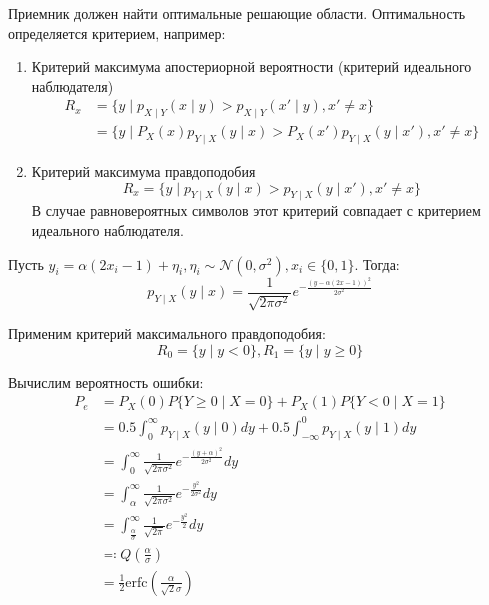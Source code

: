 Приемник должен найти оптимальные решающие области.
Оптимальность определяется критерием, например:
\begin{enumerate}
    \item Критерий максимума апостериорной вероятности (критерий идеального наблюдателя)
          \begin{align*}
              R_x
               & = \{y \mid p_{X \mid Y}(x \mid y) > p_{X \mid Y} (x' \mid y), x ' \neq x\}               \\
               & = \{y \mid P_X(x) p_{Y \mid X}(y \mid x) > P_X(x') p_{Y \mid X} (y \mid x'), x' \neq x\}
          \end{align*}
    \item Критерий максимума правдоподобия
          \[R_x = \{y \mid p_{Y \mid X}(y \mid x) > p_{Y \mid X}(y \mid x'), x' \neq x\}\]
          В случае равновероятных символов этот критерий совпадает с критерием идеального наблюдателя.
\end{enumerate}

\begin{example}
    Пусть \(y_i = \alpha(2x_i - 1) + \eta_i, \eta_i \sim \mathcal{N}(0, \sigma^2), x_i \in \{0, 1\} \). Тогда:
    \[p_{Y \mid X}(y \mid x)
        = \frac{1}{\sqrt{2 \pi \sigma^2}} e^{- \frac{(y - \alpha(2x - 1))^2}{2 \sigma^2}}\]

    Применим критерий максимального правдоподобия:
    \[R_0 = \{y \mid y < 0\}, R_1 = \{y \mid y \ge 0\} \]

    Вычислим вероятность ошибки:
    \begin{align*}
        P_e & = P_X(0)P \{Y \ge 0 \mid X = 0\} + P_X(1) P \{Y < 0 \mid X = 1\}                               \\
            & = 0.5 \int_0^\infty p_{Y \mid X}(y \mid 0) dy + 0.5 \int_{-\infty}^0 p_{Y \mid X}(y \mid 1) dy \\
            & = \int_0^\infty \frac{1}{\sqrt{2 \pi \sigma^2}} e^{ - \frac{(y + \alpha)^2}{2\sigma^2}} dy     \\
            & = \int_\alpha^\infty \frac{1}{\sqrt{2 \pi \sigma^2}} e^{ - \frac{y^2}{2\sigma^2}} dy           \\
            & = \int_{\frac{\alpha}{\sigma}}^\infty \frac{1}{\sqrt{2 \pi}} e^{ - \frac{y^2}{2}} dy           \\
            & \eqqcolon Q \left(\frac{\alpha}{\sigma}\right)                                                 \\
            & = \frac{1}{2} \text{erfc} \left(\frac{\alpha}{\sqrt{2}\sigma}\right)
    \end{align*}
\end{example}

